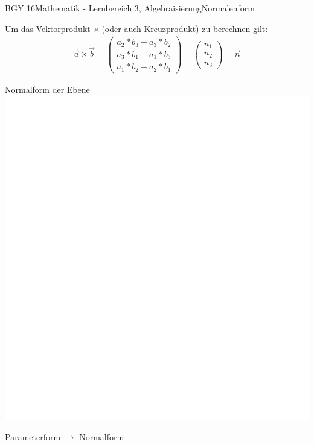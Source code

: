 \documentclass[oneside,openany,headings=optiontotoc,11pt,numbers=noenddot]{scrreprt}
\begin{document}
\begin{worksheet}{BGY 16}{Mathematik - Lernbereich 3, Algebraisierung}{Normalenform}
\begin{framed}
			\par\noindent
			Um das \color{blue}Vektorprodukt \(\times\ \)\normalcolor (oder auch Kreuzprodukt) zu berechnen gilt:\\
			\begin{align*}
				\vec{a} \times \vec{b} = \left(\begin{array}{c}a_2*b_3 - a_3*b_2\\a_3*b_1 - a_1*b_3\\a_1*b_2 - a_2*b_1\end{array}\right) = \left(\begin{array}{c}n_1\\n_2\\n_3\end{array}\right) = \vec{n}
			\end{align*}
		\end{framed}
		\begin{framed}
			\tiny{\color{codegray}Normalform der Ebene}\\
			\includegraphics[scale=0.15]{../empty.jpg}
		\end{framed}
		\begin{framed}
			\tiny{\color{codegray}Parameterform \(\rightarrow\) Normalform}\\

\end{framed}
\end{worksheet}
\end{document}
